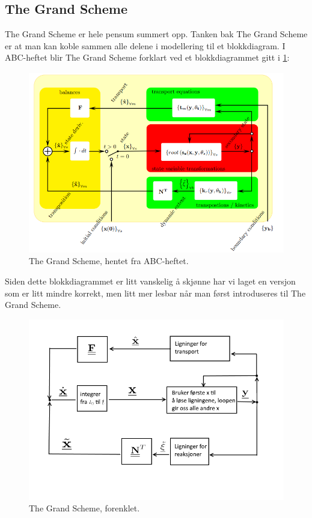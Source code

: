 \subsection{The Grand Scheme}
The Grand Scheme er hele pensum summert opp. Tanken bak The Grand Scheme er at man kan koble sammen alle delene i modellering til et blokkdiagram. I ABC-heftet blir The Grand Scheme forklart ved et blokkdiagrammet gitt i \cref{fig:grand_scheme_hard}:

\begin{figure}[H]
    \centering
    \includegraphics[scale=0.7]{Figures/The_grand_scheme_hard}
    \caption{The Grand Scheme, hentet fra ABC-heftet.}
    \label{fig:grand_scheme_hard}
\end{figure}

Siden dette blokkdiagrammet er litt vanskelig å skjønne har vi laget en versjon som er litt mindre korrekt, men litt mer lesbar når man først introduseres til The Grand Scheme.

\begin{figure}[H]
    \centering
    \includegraphics[scale=0.7]{Figures/The_grand_scheme_enkel.png}
    \caption{The Grand Scheme, forenklet.}
    \label{fig:grand_scheme_enkel}
\end{figure}

